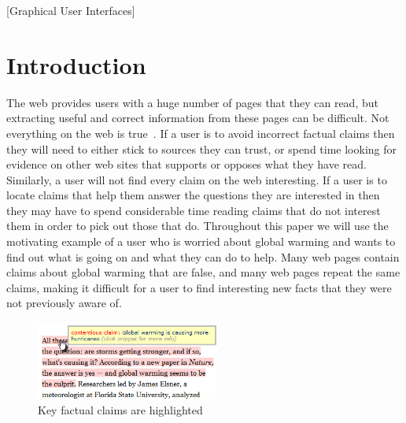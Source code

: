 \documentclass{chi2009}
\begin{document}

[Graphical User Interfaces]

\section{Introduction}

The web provides users with a huge number of pages that they can read, but extracting useful and correct information from these pages can be difficult. Not everything on the web is true~\cite{bbcwebwarning}. If a user is to avoid incorrect factual claims then they will need to either stick to sources they can trust, or spend time looking for evidence on other web sites that supports or opposes what they have read. Similarly, a user will not find every claim on the web interesting. If a user is to locate claims that help them answer the questions they are interested in then they may have to spend considerable time reading claims that do not interest them in order to pick out those that do. Throughout this paper we will use the motivating example of a user who is worried about global warming and wants to find out what is going on and what they can do to help. Many web pages contain claims about global warming that are false, and many web pages repeat the same claims, making it difficult for a user to find interesting new facts that they were not previously aware of.

\begin{figure}[tb]
	\begin{center}
	\includegraphics[width=6cm]{../screenshots/highlight_crop.png}
	\caption{Key factual claims are highlighted}
	\label{highlight}
	\end{center}
\end{figure}
\end{document}
